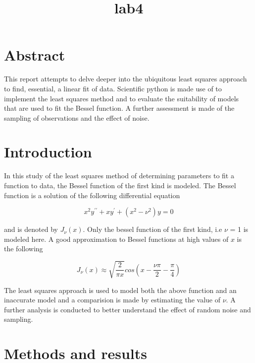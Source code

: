 \documentclass[11pt]{article}
\title{lab4}
\begin{document}
    
    
    \maketitle
    
    

    
    \section{Abstract}\label{abstract}

This report attempts to delve deeper into the ubiquitous least squares
approach to find, essential, a linear fit of data. Scientific python is
made use of to implement the least squares method and to evaluate the
suitability of models that are used to fit the Bessel function. A
further assessment is made of the sampling of observations and the
effect of noise.

    \section{Introduction}\label{introduction}

In this study of the least squares method of determining parameters to
fit a function to data, the Bessel function of the first kind is
modeled. The Bessel function is a solution of the following differential
equation

\begin{equation}
x^2y^{\prime\prime} + xy^{\prime} + (x^2- \nu^2)y = 0
\end{equation}

and is denoted by $J_\nu(x)$. Only the bessel function of the first
kind, i.e $\nu$ = 1 is modeled here. A good approximation to Bessel
functions at high values of $x$ is the following

\begin{equation}
J_\nu(x) \approx \sqrt{\frac{2}{\pi x}}cos\left(x-\frac{\nu\pi}{2}- \frac{\pi}{4}\right)
\end{equation}

The least squares approach is used to model both the above function and
an inaccurate model and a comparision is made by estimating the value of
$\nu$. A further analysis is conducted to better understand the effect
of random noise and sampling.

    \section{Methods and results}\label{methods-and-results}
\end{document}
